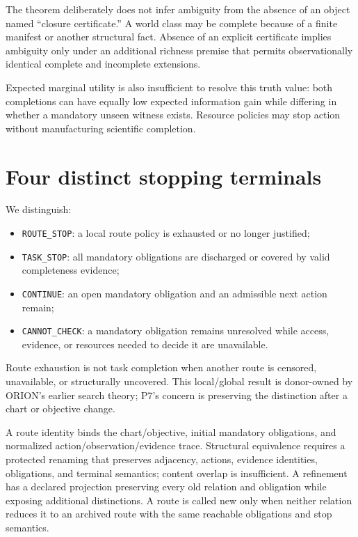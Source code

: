 \documentclass[11pt]{article}
\begin{document}
The theorem deliberately does not infer ambiguity from the absence of an object named ``closure certificate.'' A world class may be complete because of a finite manifest or another structural fact. Absence of an explicit certificate implies ambiguity only under an additional richness premise that permits observationally identical complete and incomplete extensions.

Expected marginal utility is also insufficient to resolve this truth value: both completions can have equally low expected information gain while differing in whether a mandatory unseen witness exists. Resource policies may stop action without manufacturing scientific completion.

\section{Four distinct stopping terminals}
We distinguish:
\begin{itemize}
\item \texttt{ROUTE\_STOP}: a local route policy is exhausted or no longer justified;
\item \texttt{TASK\_STOP}: all mandatory obligations are discharged or covered by valid completeness evidence;
\item \texttt{CONTINUE}: an open mandatory obligation and an admissible next action remain;
\item \texttt{CANNOT\_CHECK}: a mandatory obligation remains unresolved while access, evidence, or resources needed to decide it are unavailable.
\end{itemize}

Route exhaustion is not task completion when another route is censored, unavailable, or structurally uncovered. This local/global result is donor-owned by ORION's earlier search theory; P7's concern is preserving the distinction after a chart or objective change.

A route identity binds the chart/objective, initial mandatory obligations, and
normalized action\slash observation\slash evidence trace. Structural equivalence requires a
protected renaming that preserves adjacency, actions, evidence identities,
obligations, and terminal semantics; content overlap is insufficient. A
refinement has a declared projection preserving every old relation and
obligation while exposing additional distinctions. A route is called new only
when neither relation reduces it to an archived route with the same reachable
obligations and stop semantics.
\end{document}
